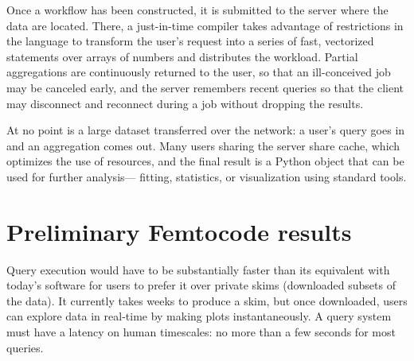 \documentclass{article}
\begin{document}
Once a workflow has been constructed, it is submitted to the server where the data are located. There, a just-in-time compiler takes advantage of restrictions in the language to transform the user's request into a series of fast, vectorized statements over arrays of numbers and distributes the workload. Partial aggregations are continuously returned to the user, so that an ill-conceived job may be canceled early, and the server remembers recent queries so that the client may disconnect and reconnect during a job without dropping the results.

At no point is a large dataset transferred over the network: a user's query goes in and an aggregation comes out. Many users sharing the server share cache, which optimizes the use of resources, and the final result is a Python object that can be used for further analysis--- fitting, statistics, or visualization using standard tools.






\section{Preliminary Femtocode results}


Query execution would have to be substantially faster than its equivalent with today's software for users to prefer it over private skims (downloaded subsets of the data). It currently takes weeks to produce a skim, but once downloaded, users can explore data in real-time by making plots instantaneously. A query system must have a latency on human timescales: no more than a few seconds for most queries.
\end{document}

